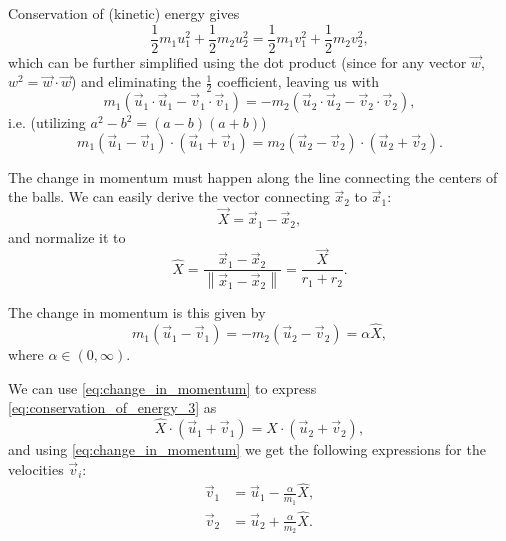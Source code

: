 \documentclass{article}
\begin{document}
Conservation of (kinetic) energy gives
\begin{equation}
    \frac{1}{2}m_{1}u_{1}^{2} + \frac{1}{2}m_{2}u_{2}^{2} = \frac{1}{2}m_{1}v_{1}^{2} + \frac{1}{2}m_{2}v_{2}^{2},
    \label{eq:conservation_of_energy_1}
\end{equation}
which can be further simplified using the dot product (since for any vector $\vec{w}$, $w^{2}=\vec{w}\cdot\vec{w}$) and eliminating the $\frac{1}{2}$ coefficient, leaving us with
\begin{equation}
    m_{1}\left( \vec{u}_{1}\cdot\vec{u}_{1} - \vec{v}_{1}\cdot\vec{v}_{1} \right) = -m_{2}\left( \vec{u}_{2}\cdot\vec{u}_{2} - \vec{v}_{2}\cdot\vec{v}_{2} \right),
    \label{eq:conservation_of_energy_2}
\end{equation}
i.e. (utilizing $a^{2}-b^{2}=(a-b)(a+b)$)
\begin{equation}
    m_{1}\left( \vec{u}_{1}-\vec{v}_{1} \right)\cdot\left( \vec{u}_{1}+\vec{v}_{1} \right) = m_{2}\left( \vec{u}_{2}-\vec{v}_{2} \right)\cdot\left( \vec{u}_{2}+\vec{v}_{2} \right).
    \label{eq:conservation_of_energy_3}
\end{equation}

The change in momentum must happen along the line connecting the centers of the balls. We can easily derive the vector connecting $\vec{x}_{2}$ to $\vec{x}_{1}$:
\begin{equation}
    \vec{X} = \vec{x}_{1}-\vec{x}_{2},
    \label{eq:connect_x1_x2}
\end{equation}
and normalize it to
\begin{equation}
    \hat{X} = \frac{\vec{x}_{1}-\vec{x}_{2}}{\left\|\vec{x}_{1}-\vec{x}_{2} \right\|} = \frac{\vec{X}}{r_{1}+r_{2}}.
    \label{eq:unit_connect_x1_x2}
\end{equation}

The change in momentum is this given by
\begin{equation}
    m_{1}\left( \vec{u}_{1}-\vec{v}_{1} \right) = -m_{2}\left( \vec{u}_{2}-\vec{v}_{2} \right) = \alpha\hat{X},
    \label{eq:change_in_momentum}
\end{equation}
where $\alpha\in\left(0, \infty\right)$.

We can use \autoref{eq:change_in_momentum} to express \autoref{eq:conservation_of_energy_3} as
\begin{equation}
    \hat{X}\cdot\left(\vec{u}_{1}+\vec{v}_{1}\right) = \hat{X}\cdot\left(\vec{u}_{2}+\vec{v}_{2}\right),
    \label{eq:label}
\end{equation}
and using \autoref{eq:change_in_momentum} we get the following expressions for the velocities $\vec{v}_{i}$:
\begin{align}
    \vec{v}_{1} &= \vec{u}_{1} - \frac{\alpha}{m_{1}}\hat{X},\nonumber\\
    \vec{v}_{2} &= \vec{u}_{2} + \frac{\alpha}{m_{2}}\hat{X}.
    \label{eq:v_from_u}
\end{align}
\end{document}
